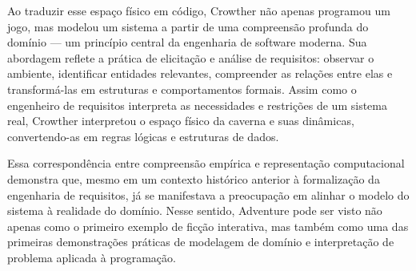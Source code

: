\documentclass[12pt,a4paper]{article}
\begin{document}
Ao traduzir esse espaço físico em código, Crowther não apenas programou um jogo, mas modelou um sistema a partir de uma compreensão profunda do domínio — um princípio central da engenharia de software moderna. Sua abordagem reflete a prática de elicitação e análise de requisitos: observar o ambiente, identificar entidades relevantes, compreender as relações entre elas e transformá-las em estruturas e comportamentos formais. Assim como o engenheiro de requisitos interpreta as necessidades e restrições de um sistema real, Crowther interpretou o espaço físico da caverna e suas dinâmicas, convertendo-as em regras lógicas e estruturas de dados.

Essa correspondência entre compreensão empírica e representação computacional demonstra que, mesmo em um contexto histórico anterior à formalização da engenharia de requisitos, já se manifestava a preocupação em alinhar o modelo do sistema à realidade do domínio. Nesse sentido, Adventure pode ser visto não apenas como o primeiro exemplo de ficção interativa, mas também como uma das primeiras demonstrações práticas de modelagem de domínio e interpretação de problema aplicada à programação.

\printbibliography
\end{document}

